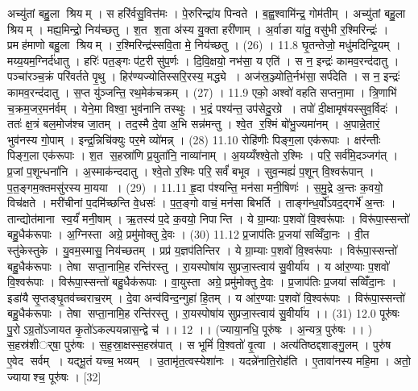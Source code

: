अच्यु॑तां बहु॒ला श्रियम् । स हरि॑र्वसु॒वित्त॑मः । पे॒रुरिन्द्रा॑य पिन्वते । ब॒ह्व॒श्वामि॑न्द्र॒ गोम॑तीम् । अच्यु॑तां बहु॒ला श्रियम् । मह्य॒मिन्द्रो॒ निय॑च्छतु । श॒त श॒ता अ॑स्य यु॒क्ता हरी॑णाम् । अ॒र्वाङा या॑तु॒ वसु॑भी र॒श्मिरिन्द्रः॑ । प्रमह॑माणो बहु॒ला श्रियम् । र॒श्मिरिन्द्र॑स्सवि॒ता मे॒ निय॑च्छतु । (26) ।
11.8
घृ॒तन्तेजो॒ मधु॑मदिन्द्रि॒यम् । मय्य॒यम॒ग्निर्द॑धातु । हरिः॑ पत॒ङ्गः प॑ट॒री सु॑प॒र्णः । दि॒वि॒क्षयो॒ नभ॑सा॒ य एति॑ । स न॒ इन्द्रः॑ कामव॒रन्द॑दातु । पञ्चा॑रञ्च॒क्रं परि॑वर्तते पृ॒थु । हिर॑ण्यज्योतिस्सरि॒रस्य॒ मद्ध्ये । अज॑स्र॒ञ्ज्योति॒र्नभ॑सा॒ सर्प॑देति । स न॒ इन्द्रः॑ कामव॒रन्द॑दातु । स॒प्त यु॑ञ्जन्ति॒ रथ॒मेक॑चक्रम् । (27) ।
11.9
एको॒ अश्वो॑ वहति सप्तना॒मा । त्रि॒णाभि॑ च॒क्रम॒जर॒मन॑र्वम् । येने॒मा विश्वा॒ भुव॑नानि तस्थुः । भ॒द्रं पश्य॑न्त॒ उप॑सेदु॒रग्रे । तपो॑ दी॒क्षामृष॑यस्सुव॒र्विदः॑ । ततः॑ क्ष॒त्रं बल॒मोज॑श्च जा॒तम् । तद॒स्मै दे॒वा अ॒भि सन्न॑मन्तु । श्वे॒त र॒श्मिं बो॑भु॒ज्यमा॑नम् । अ॒पान्ने॒तारं॒ भुव॑नस्य गो॒पाम् । इन्द्र॒न्निचि॑क्युः पर॒मे व्यो॑मन्न् । (28)
11.10
रोहि॑णीः पिङ्ग॒ला एक॑रूपाः । क्षर॑न्तीः पिङ्ग॒ला एक॑रूपाः । श॒त स॒हस्रा॑णि प्र॒युता॑नि॒ नाव्या॑नाम् । अ॒यय्यँश्श्वे॒तो र॒श्मिः । परि॒ सर्व॑मि॒दञ्जग॑त् । प्र॒जां प॒शून्धना॑नि । अ॒स्माक॑न्ददातु । श्वे॒तो र॒श्मिः परि॒ सर्वं॑ बभूव । सुव॒न्मह्यं॑ प॒शून् वि॒श्वरू॑पान् । प॒त॒ङ्गम॒क्तमसु॑रस्य मा॒यया । (29) ।
11.11
हृ॒दा प॑श्यन्ति॒ मन॑सा मनी॒षिणः॑ । स॒मु॒द्रे अ॒न्तः क॒वयो॒ विच॑क्षते । मरी॑चीनां प॒दमि॑च्छन्ति वे॒धसः॑ । प॒त॒ङ्गो वाचं॒ मन॑सा बिभर्ति । ताङ्ग॑न्ध॒र्वो॑ऽवद॒द्गर्भे॑ अ॒न्तः । तान्द्योत॑माना स्व॒र्यं॑ मनी॒षाम् । ऋ॒तस्य॑ प॒दे क॒वयो॒ निपान्ति । ये ग्रा॒म्याः प॒शवो॑ वि॒श्वरू॑पाः । विरू॑पा॒स्सन्तो॑ बहु॒धैक॑रूपाः । अ॒ग्निस्ता अग्रे॒ प्रमु॑मोक्तु दे॒वः । (30)
11.12
प्र॒जाप॑तिः प्र॒जया॑ सव्विँदा॒नः । वी॒त स्तु॑केस्तुके । यु॒वम॒स्मासु॒ निय॑च्छतम् । प्रप्र॑ य॒ज्ञप॑तिन्तिर । ये ग्रा॒म्याः प॒शवो॑ वि॒श्वरू॑पाः । विरू॑पा॒स्सन्तो॑ बहु॒धैक॑रूपाः । तेषा सप्ता॒नामि॒ह रन्ति॑रस्तु । रा॒यस्पोषा॑य सुप्रजा॒स्त्वाय॑ सु॒वीर्या॑य । य आ॑र॒ण्याः प॒शवो॑ वि॒श्वरू॑पाः । विरू॑पा॒स्सन्तो॑ बहु॒धैक॑रूपाः । वा॒युस्ता अग्रे॒ प्रमु॑मोक्तु दे॒वः । प्र॒जाप॑तिः प्र॒जया॑ सव्विँदा॒नः । इडा॑यै सृ॒प्तङ्घृ॒तव॑च्चराच॒रम् । दे॒वा अन्व॑विन्द॒न्गुहा॑ हि॒तम् । य आ॑र॒ण्याः प॒शवो॑ वि॒श्वरू॑पाः । विरू॑पा॒स्सन्तो॑ बहु॒धैक॑रूपाः । तेषा सप्ता॒नामि॒ह रन्ति॑रस्तु । रा॒यस्पोषा॑य सुप्रजा॒स्त्वाय॑ सु॒वीर्या॑य ।। (31)
12.0
पूरु॑षः पु॒रोऽग्र॒तो॑ऽजायत कृ॒तो॑ऽकल्पयन्नास॒न्द्वे च॑ ।। 12 ।। (ज्याया॒नधि॒ पूरु॑षः । अ॒न्यत्र॒ पुरु॑षः ।। )
स॒हस्र॑शीर््षा॒ पुरु॑षः । स॒ह॒स्रा॒क्षस्स॒हस्र॑पात् । स भूमिं॑ वि॒श्वतो॑ वृ॒त्वा । अत्य॑तिष्ठद्दशाङ्गु॒लम् । पुरु॑ष ए॒वेद सर्वम् । यद्भू॒तं यच्च॒ भव्यम् । उ॒तामृ॑त॒त्वस्येशा॑नः । यदन्ने॑नाति॒रोह॑ति । ए॒तावा॑नस्य महि॒मा । अतो॒ ज्यायाश्च॒ पूरु॑षः । [32]
